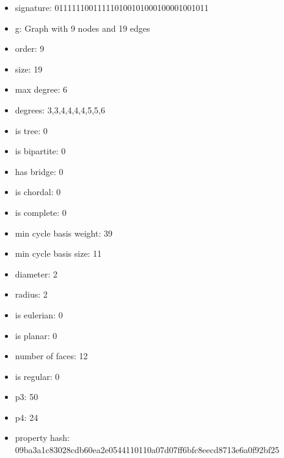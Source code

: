 \newpage
\begin{figure}
\end{figure}
\begin{itemize}
\item signature: 011111100111110100101000100001001011
\item g: Graph with 9 nodes and 19 edges
\item order: 9
\item size: 19
\item max degree: 6
\item degrees: 3,3,4,4,4,4,5,5,6
\item is tree: 0
\item is bipartite: 0
\item has bridge: 0
\item is chordal: 0
\item is complete: 0
\item min cycle basis weight: 39
\item min cycle basis size: 11
\item diameter: 2
\item radius: 2
\item is eulerian: 0
\item is planar: 0
\item number of faces: 12
\item is regular: 0
\item p3: 50
\item p4: 24
\item property hash: 09ba3a1c83028cdb60ea2e0544110110a07d07ff6bfc8eecd8713e6a0f92bf25
\end{itemize}
